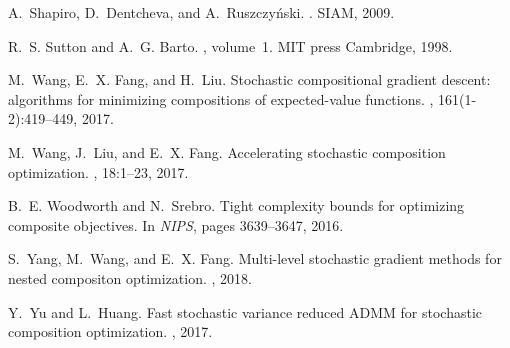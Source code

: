 \documentclass[11pt]{article}
\begin{document}
\begin{thebibliography}{10}
A.~Shapiro, D.~Dentcheva, and A.~Ruszczy{\'n}ski.
.
\newblock SIAM, 2009.

R.~S. Sutton and A.~G. Barto.
, volume~1.
\newblock MIT press Cambridge, 1998.

M.~Wang, E.~X. Fang, and H.~Liu.
\newblock Stochastic compositional gradient descent: algorithms for minimizing compositions of expected-value functions.
, 161(1-2):419--449, 2017.

M.~Wang, J.~Liu, and E.~X. Fang.
\newblock Accelerating stochastic composition optimization.
, 18:1--23, 2017.

B.~E. Woodworth and N.~Srebro.
\newblock Tight complexity bounds for optimizing composite objectives.
\newblock In {\em NIPS}, pages 3639--3647, 2016.

S.~Yang, M.~Wang, and E.~X. Fang.
\newblock Multi-level stochastic gradient methods for nested compositon optimization.
, 2018.

Y.~Yu and L.~Huang.
\newblock Fast stochastic variance reduced {ADMM} for stochastic composition optimization.
, 2017.
\end{thebibliography}

\appendix
\end{document}
